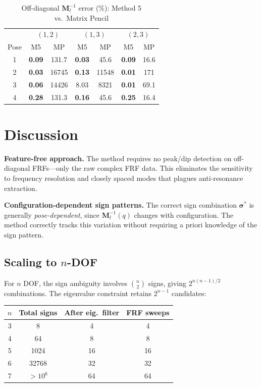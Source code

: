 \documentclass[10pt,twocolumn]{article}
\begin{document}
\begin{table}[ht]
\centering
\caption{Off-diagonal $\bm{M}_l^{-1}$ error (\%): Method 5 vs.\ Matrix Pencil}
\label{tab:multipose_err}
\begin{tabular}{ccccccc}
\toprule
& \multicolumn{2}{c}{$(1,2)$} & \multicolumn{2}{c}{$(1,3)$} & \multicolumn{2}{c}{$(2,3)$} \\
Pose & M5 & MP & M5 & MP & M5 & MP \\
\midrule
1 & \textbf{0.09} & 131.7 & \textbf{0.03} & 45.6 & \textbf{0.09} & 16.6 \\
2 & \textbf{0.03} & 16745 & \textbf{0.13} & 11548 & \textbf{0.01} & 171 \\
3 & \textbf{0.06} & 14426 & 8.03 & 8321 & \textbf{0.01} & 69.1 \\
4 & \textbf{0.28} & 131.3 & \textbf{0.16} & 45.6 & \textbf{0.25} & 16.4 \\
\bottomrule
\end{tabular}
\end{table}

\section{Discussion}

\textbf{Feature-free approach.} The method requires no peak/dip detection on off-diagonal FRFs---only the raw complex FRF data. This eliminates the sensitivity to frequency resolution and closely spaced modes that plagues anti-resonance extraction.

\textbf{Configuration-dependent sign patterns.} The correct sign combination $\bm{\sigma}^*$ is generally \emph{pose-dependent}, since $\bm{M}_l^{-1}(q)$ changes with configuration. The method correctly tracks this variation without requiring a priori knowledge of the sign pattern.

\subsection{Scaling to $n$-DOF}

For $n$ DOF, the sign ambiguity involves $\binom{n}{2}$ signs, giving $2^{n(n-1)/2}$ combinations. The eigenvalue constraint retains $2^{n-1}$ candidates:
\begin{center}
\begin{tabular}{cccc}
\toprule
$n$ & Total signs & After eig.\ filter & FRF sweeps \\
\midrule
3 & 8 & 4 & 4 \\
4 & 64 & 8 & 8 \\
5 & 1024 & 16 & 16 \\
6 & 32768 & 32 & 32 \\
7 & $>10^6$ & 64 & 64 \\
\bottomrule
\end{tabular}
\end{center}
\end{document}
